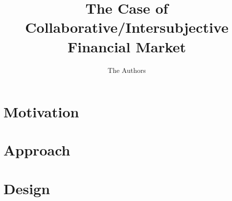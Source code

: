 \documentclass[workingdraft]{paper}
\begin{document}
\title{The Case of Collaborative/Intersubjective Financial Market}

\author{The Authors}

\begin{abstract}

\end{abstract}

\maketitle
\pagestyle{plain}

\section{Motivation}
\label{sec:motivation}


\section{Approach}
\label{sec:approach}


\section{Design}
\label{sec:design}



\end{document}
